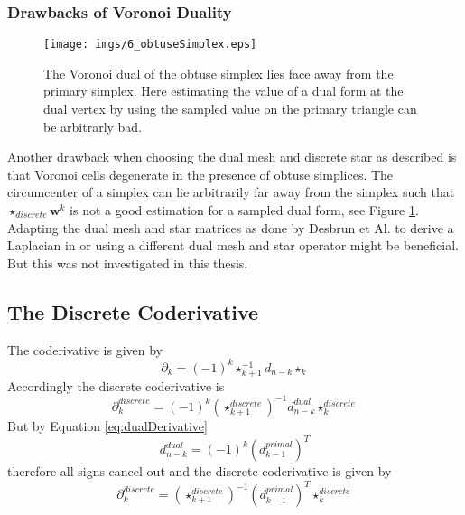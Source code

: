 \subsubsection{Drawbacks of Voronoi Duality}

\begin{figure}%
\begin{center}
\texttt{[image: imgs/6\_obtuseSimplex.eps]}%
\end{center}
\caption{The Voronoi dual of the obtuse simplex lies face away from the primary simplex. Here estimating the value of a dual form at the dual vertex by using the sampled value on the primary triangle can be arbitrarly bad.}%
\label{fig:6_obtuse}%
\end{figure}
Another drawback when choosing the dual mesh and discrete star as described is that Voronoi cells degenerate in the presence of obtuse simplices. The circumcenter of a simplex can lie arbitrarily far away from the simplex such that $\star_{discrete}\textbf{w}^k$ is not a good estimation for a sampled dual form, see Figure \ref{fig:6_obtuse}. Adapting the dual mesh and star matrices as done by Desbrun et Al. to derive a Laplacian in \cite{laplacebeltrami} or using a different dual mesh and star operator might be beneficial. But this was not investigated in this thesis. 

\subsection{The Discrete Coderivative}
The coderivative is given by
\[\partial_k =(-1)^k\star_{k+1}^{-1}d_{n-k}\star_k\]
Accordingly the discrete coderivative is 
\[\partial_k^{discrete} =(-1)^k(\star_{k+1}^{discrete})^{-1}d_{n-k}^{dual}\star_k^{discrete}\]
But by Equation \ref{eq:dualDerivative} 
$$d_{n-k}^{dual} = (-1)^k(d_{k-1}^{primal})^T$$
therefore all signs cancel out and the discrete coderivative is given by
\begin{equation}
\partial_k^{discrete} =(\star_{k+1}^{discrete})^{-1}(d_{k-1}^{primal})^T\star_k^{discrete}
\label{eq:discreteCoder}
\end{equation}


